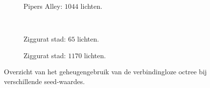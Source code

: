 \begin{figure}[t]
\begin{adjustbox}{minipage=\textwidth, scale=0.55}
\begin{subfigure}[b]{0.8\textwidth}
      \label{fig:hs-seed-memory::pa-low}
    \end{subfigure}
  \end{adjustbox} %
  \begin{adjustbox}{minipage=\textwidth, scale=0.55}
    \begin{subfigure}[b]{0.8\textwidth}
      \centering
      \def\svgwidth{\textwidth}
      
      \caption{Pipers Alley: $1044$ lichten.}
      \label{fig:hs-seed-memory::pa-high}
    \end{subfigure}
  \end{adjustbox} \\
  \begin{adjustbox}{minipage=\textwidth, scale=0.55}
    \begin{subfigure}[b]{0.8\textwidth}
      \centering
      \def\svgwidth{\textwidth}
      
      \caption{Ziggurat stad: $65$ lichten.}
      \label{fig:hs-seed-memory::zc-low}
    \end{subfigure}
  \end{adjustbox} %
  \begin{adjustbox}{minipage=\textwidth, scale=0.55}
    \begin{subfigure}[b]{0.8\textwidth}
      \centering
      \def\svgwidth{\textwidth}
      
      \caption{Ziggurat stad: $1170$ lichten.}
      \label{fig:hs-seed-memory::zc-high}
    \end{subfigure}
  \end{adjustbox}
  \caption{Overzicht van het geheugengebruik van de verbindingloze octree
           bij verschillende seed-waardes.}
  \label{fig:hs-seed-memory}
\end{figure}

